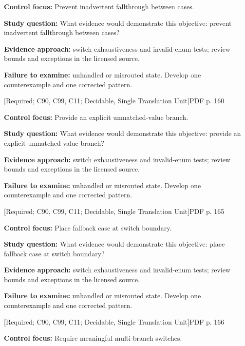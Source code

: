 \documentclass[10pt,letterpaper]{article}
\begin{document}
\textbf{Control focus:} Prevent inadvertent fallthrough between cases.\par
\textbf{Study question:} What evidence would demonstrate this objective: prevent inadvertent fallthrough between cases?\par
\textbf{Evidence approach:} switch exhaustiveness and invalid-enum tests; review bounds and exceptions in the licensed source.\par
\textbf{Failure to examine:} unhandled or misrouted state. Develop one counterexample and one corrected pattern.\par
\smallskip
{}
 \textsf{\footnotesize [Required; C90, C99, C11; Decidable, Single Translation Unit]}\hfill{\footnotesize PDF p. 160}\par
\textbf{Control focus:} Provide an explicit unmatched-value branch.\par
\textbf{Study question:} What evidence would demonstrate this objective: provide an explicit unmatched-value branch?\par
\textbf{Evidence approach:} switch exhaustiveness and invalid-enum tests; review bounds and exceptions in the licensed source.\par
\textbf{Failure to examine:} unhandled or misrouted state. Develop one counterexample and one corrected pattern.\par
\smallskip
{}
 \textsf{\footnotesize [Required; C90, C99, C11; Decidable, Single Translation Unit]}\hfill{\footnotesize PDF p. 165}\par
\textbf{Control focus:} Place fallback case at switch boundary.\par
\textbf{Study question:} What evidence would demonstrate this objective: place fallback case at switch boundary?\par
\textbf{Evidence approach:} switch exhaustiveness and invalid-enum tests; review bounds and exceptions in the licensed source.\par
\textbf{Failure to examine:} unhandled or misrouted state. Develop one counterexample and one corrected pattern.\par
\smallskip
{}
 \textsf{\footnotesize [Required; C90, C99, C11; Decidable, Single Translation Unit]}\hfill{\footnotesize PDF p. 166}\par
\textbf{Control focus:} Require meaningful multi-branch switches.\par
\end{document}
